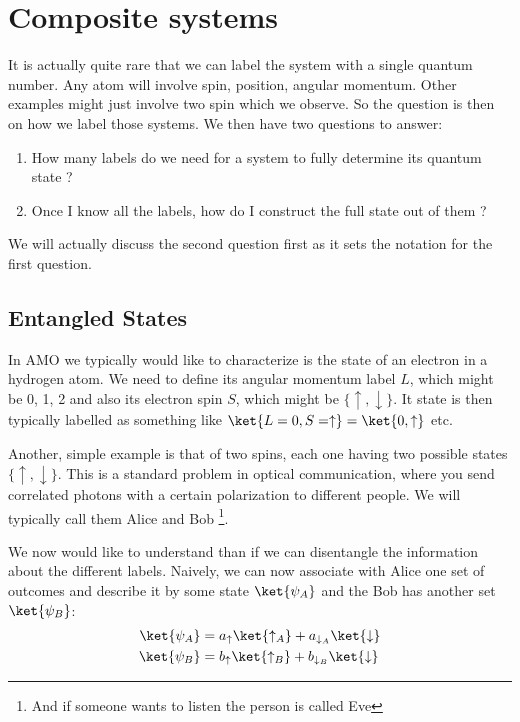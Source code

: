 \section{Composite systems}
It is actually quite rare that we can label the system with a single quantum number. Any atom will involve spin, position, angular momentum. Other examples might just involve two spin which we observe. So the question is then on how we label those systems. We then have two questions to answer:
\begin{enumerate}
\item How many labels do we need for a system to fully determine its quantum state ?
\item Once I know all the labels, how do I construct the full state out of them ?
\end{enumerate}
We will actually discuss the second question first as it sets the notation for the first question.



\subsection{Entangled States}
 
In AMO we typically would like to characterize is the state of an electron in a hydrogen atom. We need to define its angular momentum label $L$, which might be 0, 1, 2 and also its electron spin $S$, which might be $\{\uparrow, \downarrow\}$. It state is then typically labelled as something like $\ket{L=0, S=\uparrow} = \ket{0,\uparrow}$ etc.

Another, simple example is that of two spins, each one having two possible states $\{\uparrow, \downarrow\}$. This is a standard problem in optical communication, where you send correlated photons with a certain polarization to different people. We will typically call them Alice and Bob \footnote{And if someone wants to listen the person is called Eve}.

We now  would like to understand than if we can disentangle the information about the different labels. Naively, we can now  associate with Alice one set of outcomes and describe it by some state $\ket{\psi_{A}}$ and the Bob has another set $\ket{\psi_{B}}$:
\begin{align}
	\ket{\psi_A}&= a_{\uparrow} \ket{\uparrow_A}+ a_{\downarrow_A} \ket{\downarrow}\\
	\ket{\psi_B}&= b_{\uparrow} \ket{\uparrow_B}+ b_{\downarrow_B} \ket{\downarrow}
\end{align}

